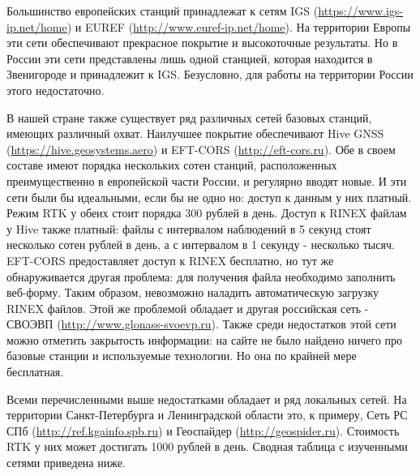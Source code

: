 \documentclass[a4paper,12pt]{report}
\begin{document}
Большинство европейских станций принадлежат к сетям IGS (\url{https://www.igs-ip.net/home}) и EUREF (\url{http://www.euref-ip.net/home}). 
На территории Европы эти сети обеспечивают прекрасное покрытие и высокоточные 
результаты. Но в России эти сети представлены лишь одной станцией, которая находится в Звенигороде и принадлежит к IGS. Безусловно, для работы 
на территории России этого недостаточно. \par
В нашей стране также существует ряд различных сетей базовых станций, имеющих различный охват. Наилучшее покрытие обеспечивают Hive GNSS 
(\url{https://hive.geosystems.aero}) и EFT-CORS (\url{http://eft-cors.ru}). Обе в своем составе имеют порядка нескольких сотен станций, 
расположенных преимущественно в европейской части России, и регулярно 
вводят новые. И эти сети были бы идеальными, если бы не одно но: доступ к данным у них платный. Режим RTK у обеих стоит порядка 300 рублей в день. 
Доступ к RINEX файлам у Hive также платный: файлы с интервалом наблюдений в 5 секунд стоят несколько сотен рублей в день, а с интервалом 
в 1 секунду - несколько тысяч. EFT-CORS предоставляет доступ к RINEX бесплатно, но тут же обнаруживается другая проблема: для получения файла 
необходимо заполнить веб-форму. Таким образом, невозможно наладить автоматическую загрузку RINEX файлов. Этой же проблемой обладает и другая 
российская сеть - СВОЭВП (\url{http://www.glonass-svoevp.ru}). Также среди недостатков этой сети можно отметить закрытость информации: 
на сайте не было найдено ничего про базовые станции и используемые технологии. Но она по крайней мере бесплатная. \par
Всеми перечисленными выше недостатками обладает и ряд локальных сетей. На территории Санкт-Петербурга и Ленинградской области это, к примеру, 
Сеть РС СПб (\url{http://ref.kgainfo.spb.ru}) и Геоспайдер (\url{http://geospider.ru}). Стоимость RTK у них может достигать 1000 рублей в день.
Сводная таблица с изученными сетями приведена ниже.
\end{document}
